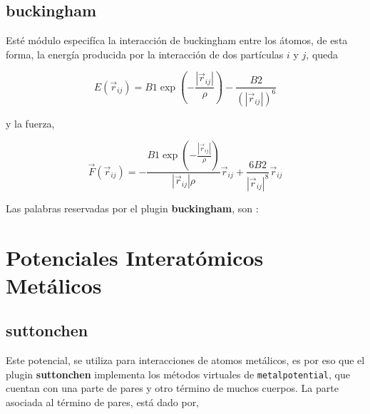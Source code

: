 \subsection{buckingham}

Est\'e m\'odulo especif\'ica la interacci\'on de buckingham entre los \'atomos, de esta forma, la energ\'ia producida por la interacci\'on de dos part\'iculas $i$ y $j$, queda

$$E(\vec{r}_{ij}) = B1 \exp\left(-\frac{|\vec{r}_{ij}|}{\rho}\right) - \frac{B2}{(|\vec{r}_{ij}|)^6}$$

y la fuerza,

$$\vec{F}(\vec{r}_{ij}) = -\frac{B1\exp\left(-\frac{|\vec{r}_{ij}|}{\rho}\right)}{|\vec{r}_{ij}|\rho}\vec{r}_{ij} + \frac{6B2}{|\vec{r}_{ij}|^8}\vec{r}_{ij}$$

Las palabras reservadas por el plugin \textbf{buckingham}, son :


\section{Potenciales Interat\'omicos Met\'alicos}
\subsection{suttonchen}
Este potencial, se utiliza para interacciones de atomos met\'alicos, es por eso que el plugin \textbf{suttonchen} implementa los m\'etodos virtuales de \verb|metalpotential|, que cuentan con una parte de pares y otro t\'ermino de muchos cuerpos. La parte asociada al t\'ermino de pares, est\'a dado por,


